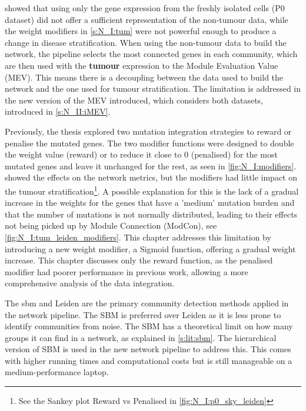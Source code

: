  showed that using only the gene expression from the freshly isolated cells (P0 dataset) did not offer a sufficient representation of the non-tumour data, while the weight modifiers in \cref{s:N_I:tum} were not powerful enough to produce a change in disease stratification. When using the non-tumour data to build the network, the pipeline selects the most connected genes in each community, which are then used with the \textbf{tumour} expression to the Module Evaluation Value (MEV). This means there is a decoupling between the data used to build the network and the one used for tumour stratification. The limitation is addressed in the new version of the MEV introduced, which considers both datasets, introduced in \cref{s:N_II:iMEV}.


Previously, the thesis explored two mutation integration strategies to reward or penalise the mutated genes. The two modifier functions were designed to double the weight value (reward) or to reduce it close to 0 (penalised) for the most mutated genes and leave it unchanged for the rest, as seen in \cref{fig:N_I:modifiers}.  showed the effects on the network metrics, but the modifiers had little impact on the tumour stratification\footnote{See the Sankey plot Reward vs Penalised in \cref{fig:N_I:p0_sky_leiden}}. A possible explanation for this is the lack of a gradual increase in the weights for the genes that have a 'medium' mutation burden and that the number of mutations is not normally distributed, leading to their effects not being picked up by Module Connection (ModCon), see \cref{fig:N_I:tum_leiden_modifiers}. This chapter addresses this limitation by introducing a new weight modifier, a Sigmoid function, offering a gradual weight increase. This chapter discusses only the reward function, as the penalised modifier had poorer performance in previous work, allowing a more comprehensive analysis of the data integration.


The \acrfull{sbm} and Leiden are the primary community detection methods applied in the network pipeline. The SBM is preferred over Leiden as it is less prone to identify communities from noise. The SBM has a theoretical limit on how many groups it can find in a network, as explained in \cref{s:lit:sbm}. The hierarchical version of SBM is used in the new network pipeline to address this. This comes with higher running times and computational costs but is still manageable on a medium-performance laptop.


